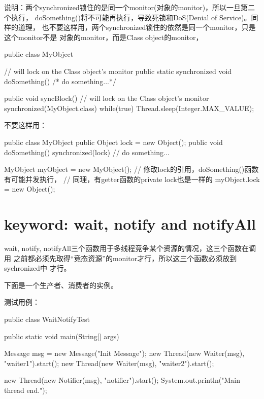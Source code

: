 说明：两个synchronized锁住的是同一个monitor(对象的monitor)，所以一旦第二个执行，
doSomething()将不可能再执行，导致死锁和DoS(Denial of Service)。同样的道理，
也不要这样用，两个synchronized锁住的依然是同一个monitor，只是这个monitor不是
对象的monitor，而是Class object的monitor，\\
\begin{javacode}
public class MyObject {
    // will lock on the Class object's monitor
    public static synchronized void doSomething() {
        /* do something...*/
    }

    public void syncBlock() {
        // will lock on the Class object's monitor
        synchronized(MyObject.class) {
            while(true) {
                Thread.sleep(Integer.MAX_VALUE);
            }
        }
    }
}
\end{javacode}

不要这样用：\\
\begin{javacode}
public class MyObject {
    public Object lock = new Object();
    public void doSomething() {
        synchronized(lock) {
            // do something...
        }
    }
}

MyObject myObject = new MyObject();
// 修改lock的引用，doSomething()函数有可能并发执行，
// 同理，有getter函数的private lock也是一样的
myObject.lock = new Object();
\end{javacode}



\section[keyword: wait, notify and notifyAll]{keyword: wait, notify and notifyAll}
wait, notify, notifyAll三个函数用于多线程竞争某个资源的情况，这三个函数在调用
之前都必须先取得“竞态资源”的monitor才行，所以这三个函数必须放到sychronized中
才行。

下面是一个生产者、消费者的实例。

测试用例：

\begin{javacode}
public class WaitNotifyTest {
  public static void main(String[] args) {
    Message msg = new Message("Init Message");
    new Thread(new Waiter(msg), "waiter1").start();
    new Thread(new Waiter(msg), "waiter2").start();

    new Thread(new Notifier(msg), "notifier").start();
    System.out.println("Main thread end.");
  }
}
\end{javacode}

